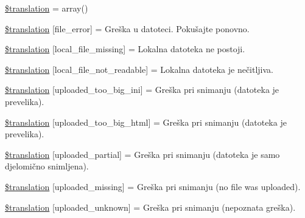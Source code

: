 \begin{DoxyCompactItemize}
\item 
\hyperlink{class_8upload_8hr___h_r_8php_a1f198d410fecc3871ebdd468d343a5e3}{\$translation} = array()
\item 
\hyperlink{class_8upload_8hr___h_r_8php_ac7498e49b9771b04698029aa61c70821}{\$translation} \mbox{[}\textquotesingle{}file\+\_\+error\textquotesingle{}\mbox{]} = \textquotesingle{}Greška u datoteci. Pokušajte ponovno.\textquotesingle{}
\item 
\hyperlink{class_8upload_8hr___h_r_8php_a6ec3d3a47ab70d77e7aa593e82ead10e}{\$translation} \mbox{[}\textquotesingle{}local\+\_\+file\+\_\+missing\textquotesingle{}\mbox{]} = \textquotesingle{}Lokalna datoteka ne postoji.\textquotesingle{}
\item 
\hyperlink{class_8upload_8hr___h_r_8php_a60104befef9b241f3a7a6a755618a4b3}{\$translation} \mbox{[}\textquotesingle{}local\+\_\+file\+\_\+not\+\_\+readable\textquotesingle{}\mbox{]} = \textquotesingle{}Lokalna datoteka je nečitljiva.\textquotesingle{}
\item 
\hyperlink{class_8upload_8hr___h_r_8php_a6a08dcd0d3651fdd098568f6b2f0a42c}{\$translation} \mbox{[}\textquotesingle{}uploaded\+\_\+too\+\_\+big\+\_\+ini\textquotesingle{}\mbox{]} = \textquotesingle{}Greška pri snimanju (datoteka je prevelika).\textquotesingle{}
\item 
\hyperlink{class_8upload_8hr___h_r_8php_a623d5b8b92169f57d7e43458aa911cbb}{\$translation} \mbox{[}\textquotesingle{}uploaded\+\_\+too\+\_\+big\+\_\+html\textquotesingle{}\mbox{]} = \textquotesingle{}Greška pri snimanju (datoteka je prevelika).\textquotesingle{}
\item 
\hyperlink{class_8upload_8hr___h_r_8php_a967c17da21b0a2d3bd65cca3a9ca0ea8}{\$translation} \mbox{[}\textquotesingle{}uploaded\+\_\+partial\textquotesingle{}\mbox{]} = \textquotesingle{}Greška pri snimanju (datoteka je samo djelomično snimljena).\textquotesingle{}
\item 
\hyperlink{class_8upload_8hr___h_r_8php_a0cce433260be65f1f35853a6b4b8952b}{\$translation} \mbox{[}\textquotesingle{}uploaded\+\_\+missing\textquotesingle{}\mbox{]} = \textquotesingle{}Greška pri snimanju (no file was uploaded).\textquotesingle{}
\item 
\hyperlink{class_8upload_8hr___h_r_8php_a4a9168e922b827e6a28b5db1c00774ca}{\$translation} \mbox{[}\textquotesingle{}uploaded\+\_\+unknown\textquotesingle{}\mbox{]} = \textquotesingle{}Greška pri snimanju (nepoznata greška).\textquotesingle{}
\item 

\end{DoxyCompactItemize}
